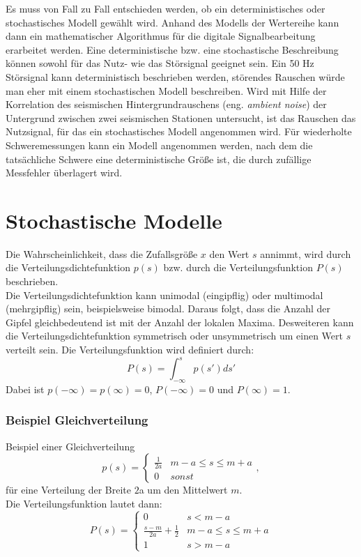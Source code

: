 Es muss von Fall zu Fall entschieden werden, ob ein deterministisches oder stochastisches Modell gewählt wird. Anhand des Modells der Wertereihe kann dann ein mathematischer Algorithmus für die digitale Signalbearbeitung erarbeitet werden. Eine deterministische bzw. eine stochastische Beschreibung können sowohl für das Nutz- wie das Störsignal geeignet sein. Ein 50 Hz Störsignal kann deterministisch beschrieben werden, störendes Rauschen würde man eher mit einem stochastischen Modell beschreiben. Wird mit Hilfe der Korrelation des seismischen Hintergrundrauschens (eng. \textsl{ambient noise}) der Untergrund zwischen zwei seismischen Stationen untersucht, ist das Rauschen das Nutzsignal, für das ein stochastisches Modell angenommen wird. Für wiederholte Schweremessungen kann ein Modell angenommen werden, nach dem die tatsächliche Schwere eine deterministische Größe ist, die durch zufällige Messfehler überlagert wird. 

\section{Stochastische Modelle}
Die Wahrscheinlichkeit, dass die Zufallsgröße $x$ den Wert $s$ annimmt, wird durch die  Verteilungsdichtefunktion $p(s)$ bzw. durch die Verteilungsfunktion $P(s)$ be\-schrieben.\\
Die Verteilungsdichtefunktion kann unimodal (eingipflig) oder multimodal (mehrgipflig) sein, beispielsweise bimodal. Daraus folgt, dass die Anzahl der Gipfel gleichbedeutend ist mit der Anzahl der lokalen Maxima. Desweiteren kann die Verteilungsdichtefunktion symmetrisch oder unsymmetrisch um einen Wert $s$ verteilt sein. Die Verteilungsfunktion wird definiert durch:
\begin{equation}
P(s)=\int_{-\infty}^s p(s')ds'
\end{equation}
Dabei ist $p(-\infty)=p(\infty)=0$, $P(-\infty)=0$ und $P(\infty)=1$.

\subsubsection*{Beispiel Gleichverteilung}
Beispiel einer Gleichverteilung
\begin{equation}
p(s)=
\begin{cases}
  \frac{1}{2a} & m-a \leq s\leq m+a\\
 0 & sonst
\end{cases},
\end{equation}
für eine Verteilung der Breite $2$a um den Mittelwert $m$.\\
Die Verteilungsfunktion lautet dann:
\[
P(s)=
\begin{cases}
0 &  s<m-a\\
\frac{s-m}{2a} + \frac{1}{2} & m-a\leq s\leq m+a\\
1 & s>m-a
\end{cases}
\]

